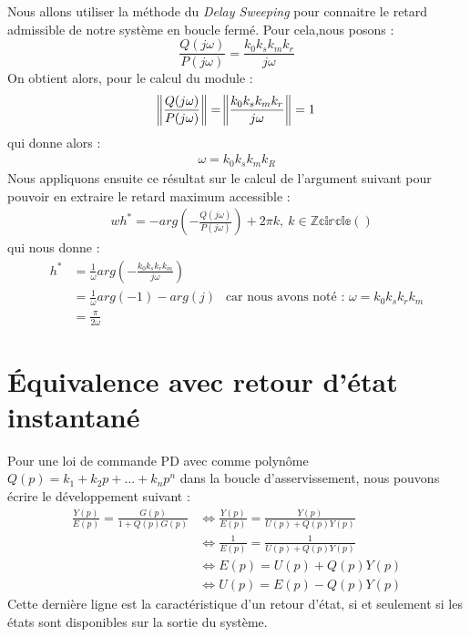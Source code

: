 Nous allons utiliser la méthode du \emph{Delay Sweeping} pour connaitre le retard admissible de notre système en boucle fermé. Pour cela,nous posons :
\begin{equation}\label{eqn:delaySweepingCorPD}
\frac{Q(j\omega)}{P(j\omega)} = \frac{k_0k_sk_mk_r}{j\omega} 
\end{equation}
On obtient alors, pour le calcul du module :
\begin{align}
\norm{\frac{Q(j\omega)}{P(j\omega)}} 	&= \norm{\frac{k_0k_sk_mk_r}{j\omega}} = 1\\
\end{align}
qui donne alors : 
\begin{align*}
\omega= k_0k_sk_mk_R
\end{align*}
Nous appliquons ensuite ce résultat sur le calcul de l'argument suivant pour pouvoir en extraire le retard maximum accessible : 
\begin{align}
&wh^* = -arg\left(-\frac{Q(j\omega)}{P(j\omega)}\right)+2\pi k,\ k \in  \mathbb{Zcircle ()}
\end{align}
qui nous donne :
\begin{align*}
h^* &= \frac{1}{\omega}arg\left(-\frac{k_0k_sk_rk_m}{j\omega}\right)\\
	&= \frac{1}{\omega}arg(-1)	- arg(j)\ \ \text{     car nous avons noté : } \omega = k_0k_sk_rk_m\\
	&= \frac{\pi}{2 \omega}
\end{align*}
\section{Équivalence avec retour d'état instantané}
Pour une loi de commande PD avec comme polynôme $Q(p) = k_1+k_2p+...+k_np^n$ dans la boucle d'asservissement, nous pouvons écrire le développement suivant : 
\begin{align*}
\frac{Y(p)}{E(p)} = \frac{G(p)}{1 + Q(p)G(p)} & \Leftrightarrow \frac{Y(p)}{E(p)} = \frac{Y(p)}{U(p) + Q(p)Y(p)}\\
&\Leftrightarrow \frac{1}{E(p)} = \frac{1}{U(p) + Q(p)Y(p)} \\
& \Leftrightarrow E(p) = U(p) + Q(p)Y(p)\\
& \Leftrightarrow U(p) = E(p) - Q(p)Y(p)
\end{align*} 
Cette dernière ligne est la caractéristique d'un retour d'état, si et seulement si les états sont disponibles sur la sortie du système.